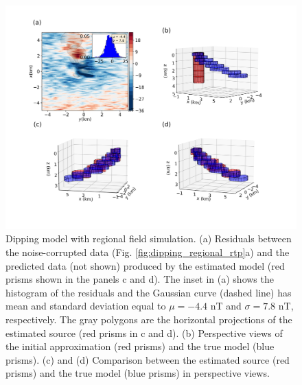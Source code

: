 \begin{figure}
    \centering
    \includegraphics[width=\linewidth]{figures/regional-l2-solution.png}
    \caption{Dipping model with regional field simulation. (a) Residuals between the  noise-corrupted data (Fig. \ref{fig:dipping_regional_rtp}a) and the predicted data (not shown) produced by the estimated model (red prisms shown in the panels c and d). The inset in (a) shows the histogram of the residuals and the Gaussian curve (dashed line) has mean and standard deviation equal   to $\mu = -4.4$ nT and $\sigma=7.8$ nT, respectively. 
    The gray polygons are the horizontal projections of the estimated source (red prisms in c and d).
     (b) Perspective views of the initial approximation (red prisms) and the true model (blue prisms). 
     (c) and (d) Comparison between the estimated source (red prisms) and the true model (blue prisms) in perspective views.     
}
    \label{fig:regional-results}
\end{figure}


